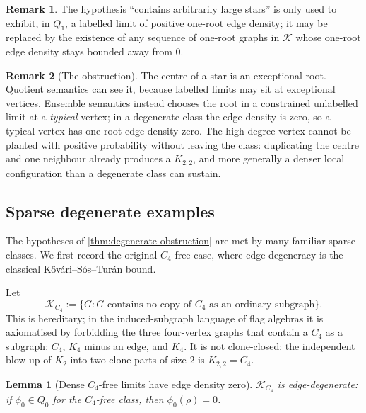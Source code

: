 \documentclass[11pt]{article}
\newtheorem{lemma}[lemma]{Lemma}
\theoremstyle{definition}
\newtheorem{remark}[remark]{Remark}
\newcommand{\K}{\mathcal{K}}
\newcommand{\vtype}{\mathsf{1}}
\begin{document}
\begin{remark}
The hypothesis ``contains arbitrarily large stars'' is only used to exhibit, in
$Q_{\vtype}$, a labelled limit of positive one-root edge density; it may be replaced by the
existence of any sequence of one-root graphs in $\K$ whose one-root edge density stays
bounded away from $0$.
\end{remark}

\begin{remark}[The obstruction]
The centre of a star is an exceptional root.  Quotient semantics can see
it, because labelled limits may sit at exceptional vertices.  Ensemble semantics
instead chooses the root in a constrained unlabelled limit at a \emph{typical} vertex; in a
degenerate class the edge density is zero, so a typical vertex has one-root edge
density zero.  The high-degree vertex cannot be planted with positive probability
without leaving the class: duplicating the centre and one neighbour already produces
a $K_{2,2}$, and more generally a denser local configuration than a degenerate class can
sustain.
\end{remark}

\subsection{Sparse degenerate examples}

The hypotheses of \cref{thm:degenerate-obstruction} are met by many familiar
sparse classes.  We first record the original $C_4$-free case, where edge-degeneracy
is the classical K\H{o}v\'ari--S\'os--Tur\'an bound.

Let
\[
  \K_{C_4}:=\{G:\text{$G$ contains no copy of $C_4$ as an ordinary subgraph}\}.
\]
This is hereditary; in the induced-subgraph language of flag algebras it is
axiomatised by forbidding the three four-vertex graphs that contain a $C_4$ as a
subgraph: $C_4$, $K_4$ minus an edge, and $K_4$.  It is not clone-closed: the
independent blow-up of $K_2$ into two clone parts of size $2$ is $K_{2,2}=C_4$.

\begin{lemma}[Dense \texorpdfstring{$C_4$}{C4}-free limits have edge density zero]\label{lem:c4-edge-zero}
$\K_{C_4}$ is edge-degenerate: if $\phi_0\in Q_0$ for the $C_4$-free class, then
$\phi_0(\rho)=0$.
\end{lemma}
\end{document}
